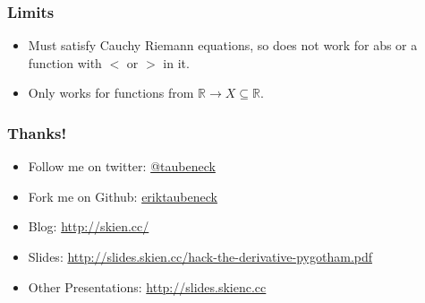 \documentclass{beamer}
\def\R{\mathbb{R}}                     %
\begin{document}
\begin{frame}
\frametitle{Limits}

  \begin{itemize}
    \item Must satisfy Cauchy Riemann equations, so does not work for abs or a function with $<$ or $>$ in it.
    \item Only works for functions from $\R \to X \subseteq \R$.
  \end{itemize}

\end{frame}

\begin{frame}

\frametitle{Thanks!}

\begin{itemize}
  \item Follow me on twitter: \href{https://twitter.com/taubeneck}{@taubeneck}
  \item Fork me on Github: \href{https://github.com/eriktaubeneck}{eriktaubeneck}
  \item Blog: \url{http://skien.cc/}
  \item Slides: \url{http://slides.skien.cc/hack-the-derivative-pygotham.pdf}
  \item Other Presentations: \url{http://slides.skienc.cc}
\end{itemize}

\end{frame}
\end{document}
